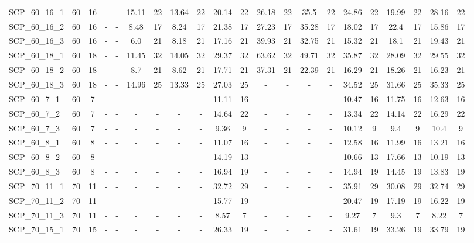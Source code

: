 \begin{sidewaystable}[!ht]
{\begin{tabular}{lcccccccccccccccccccc}
SCP\_60\_16\_1 & 60 & 16 &  - &  - & 15.11 & 22 & 13.64 & 22 & 20.14 & 22 & 26.18 & 22 & 35.5 & 22 & 24.86 & 22 & 19.99 & 22 & 28.16 & 22 \\
SCP\_60\_16\_2 & 60 & 16 &  - &  - & 8.48 & 17 & 8.24 & 17 & 21.38 & 17 & 27.23 & 17 & 35.28 & 17 & 18.02 & 17 & 22.4 & 17 & 15.86 & 17 \\
SCP\_60\_16\_3 & 60 & 16 &  - &  - & 6.0 & 21 & 8.18 & 21 & 17.16 & 21 & 39.93 & 21 & 32.75 & 21 & 15.32 & 21 & 18.1 & 21 & 19.43 & 21 \\
SCP\_60\_18\_1 & 60 & 18 &  - &  - & 11.45 & 32 & 14.05 & 32 & 29.37 & 32 & 63.62 & 32 & 49.71 & 32 & 35.87 & 32 & 28.09 & 32 & 29.55 & 32 \\
SCP\_60\_18\_2 & 60 & 18 &  - &  - & 8.7 & 21 & 8.62 & 21 & 17.71 & 21 & 37.31 & 21 & 22.39 & 21 & 16.29 & 21 & 18.26 & 21 & 16.23 & 21 \\
SCP\_60\_18\_3 & 60 & 18 &  - &  - & 14.96 & 25 & 13.33 & 25 & 27.03 & 25 &  - &  - &  - &  - & 34.52 & 25 & 31.66 & 25 & 35.33 & 25 \\
SCP\_60\_7\_1 & 60 & 7 &  - &  - &  - &  - &  - &  - & 11.11 & 16 &  - &  - &  - &  - & 10.47 & 16 & 11.75 & 16 & 12.63 & 16 \\
SCP\_60\_7\_2 & 60 & 7 &  - &  - &  - &  - &  - &  - & 14.64 & 22 &  - &  - &  - &  - & 13.34 & 22 & 14.14 & 22 & 16.29 & 22 \\
SCP\_60\_7\_3 & 60 & 7 &  - &  - &  - &  - &  - &  - & 9.36 & 9 &  - &  - &  - &  - & 10.12 & 9 & 9.4 & 9 & 10.4 & 9 \\
SCP\_60\_8\_1 & 60 & 8 &  - &  - &  - &  - &  - &  - & 11.07 & 16 &  - &  - &  - &  - & 12.58 & 16 & 11.99 & 16 & 13.21 & 16 \\
SCP\_60\_8\_2 & 60 & 8 &  - &  - &  - &  - &  - &  - & 14.19 & 13 &  - &  - &  - &  - & 10.66 & 13 & 17.66 & 13 & 10.19 & 13 \\
SCP\_60\_8\_3 & 60 & 8 &  - &  - &  - &  - &  - &  - & 16.94 & 19 &  - &  - &  - &  - & 14.94 & 19 & 14.45 & 19 & 13.83 & 19 \\
SCP\_70\_11\_1 & 70 & 11 &  - &  - &  - &  - &  - &  - & 32.72 & 29 &  - &  - &  - &  - & 35.91 & 29 & 30.08 & 29 & 32.74 & 29 \\
SCP\_70\_11\_2 & 70 & 11 &  - &  - &  - &  - &  - &  - & 15.77 & 19 &  - &  - &  - &  - & 20.47 & 19 & 17.19 & 19 & 16.22 & 19 \\
SCP\_70\_11\_3 & 70 & 11 &  - &  - &  - &  - &  - &  - & 8.57 & 7 &  - &  - &  - &  - & 9.27 & 7 & 9.3 & 7 & 8.22 & 7 \\
SCP\_70\_15\_1 & 70 & 15 &  - &  - &  - &  - &  - &  - & 26.33 & 19 &  - &  - &  - &  - & 31.61 & 19 & 33.26 & 19 & 33.79 & 19 \\

\end{tabular}}
\end{sidewaystable}
